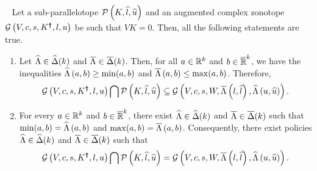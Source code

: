 \begin{lemma}~\label{lem:affineapproximation} Let a sub-parallelotope
  $\mathcal{P}\left(K,\widehat{l},\widehat{u}\right)$ and an augmented complex zonotope
  $\mathcal{G}\left(V,c,s,K^{\bm{\dagger}},l,u\right)$ be such that $VK=0$.  Then,
  all
  the following statements are true.
\begin{enumerate}
\item Let $\widehat{\Lambda}\in\widehat{\Delta}(k)$ and
  $\overline{\Lambda}\in\overline{\Delta}(k)$.  %
  Then, for all $a
  \in\mathbb{R}^k$ and $b\in\mathbb{\overline{R}}^k$, we have the inequalities $\widehat{\Lambda}\left(a,b\right)\geq \min(a,b)$ and
  $\overline{\Lambda}\left(a,b\right)\leq \max(a,b)$.
  Therefore, \[\mathcal{G}\left(V,c,s,K^{\bm{\dagger}},l,u\right)\bigcap \mathcal{P}\left(K,\widehat{l},\widehat{u}\right) \subseteq
  \mathcal{G}\left(V,c,s,W,\overline{\Lambda}\left(l,\widehat{l}\right),\widehat{\Lambda}\left(u,\widehat{u}\right)\right).\]
\item For every $a\in\mathbb{R}^k$ and $b\in\mathbb{\overline{R}}^k$, there exist
  $\widehat{\Lambda}\in\widehat{\Delta}(k)$ and
  $\overline{\Lambda}\in\overline{\Delta}(k)$ such that
  $\min(a,b)=\widehat{\Lambda}\left(a,b\right)$ and
  $\max(a,b)=\overline{\Lambda}\left(a,b\right)$. Consequently, there exist policies
  $\widehat{\Lambda}\in\widehat{\Delta}(k)$ and
  $\overline{\Lambda}\in\overline{\Delta}(k)$ such that
\[\mathcal{G}\left(V,c,s,K^{\bm{\dagger}},l,u\right)\bigcap \mathcal{P}\left(K,\widehat{l},\widehat{u}\right) =
  \mathcal{G}\left(V,c,s,W,\overline{\Lambda}\left(l,\widehat{l}\right),\widehat{\Lambda}\left(u,\widehat{u}\right)\right).\]
\end{enumerate}
\end{lemma}





